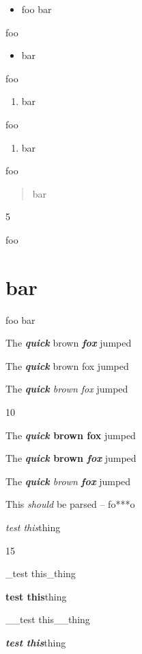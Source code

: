 
\def\mytitle{Edge Cases}


\begin{itemize}
\item foo
bar
\end{itemize}

foo

\begin{itemize}
\item bar
\end{itemize}

foo

\begin{enumerate}
\item bar
\end{enumerate}

foo

\begin{enumerate}
\item bar
\end{enumerate}

foo

\begin{quote}
bar
\end{quote}

5

foo

\part{bar}
\label{bar}

foo
bar

The \textbf{\emph{quick}} brown \textbf{\emph{fox}} jumped

The \textbf{\emph{quick}} brown fox jumped

The \emph{\textbf{quick} brown fox} jumped

10

The \textbf{\emph{quick} brown fox} jumped

The \textbf{\emph{quick} brown \emph{fox}} jumped

The \emph{\textbf{quick} brown \textbf{fox}} jumped

This \emph{should} be parsed -- fo***o

\emph{test this}thing

15

\_test this\_thing

\textbf{test this}thing

\_\_test this\_\_thing

\textbf{\emph{test this}}thing

